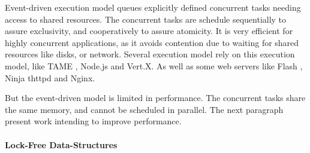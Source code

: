 Event-driven execution model queues explicitly defined concurrent tasks needing access to shared resources.
The concurrent tasks are schedule sequentially to assure exclusivity, and cooperatively to assure atomicity.
It is very efficient for highly concurrent applications, as it avoids contention due to waiting for shared resources like disks, or network.
Several execution model rely on this execution model, like TAME \cite{Krohn2007}, Node.js and Vert.X.
As well as some web servers like Flash \cite{Pai1999}, Ninja \cite{Gribble2001} thttpd and Nginx.





But the event-driven model is limited in performance.
The concurrent tasks share the same memory, and cannot be scheduled in parallel.
The next paragraph present work intending to improve performance. %

\paragraph{Lock-Free Data-Structures}

